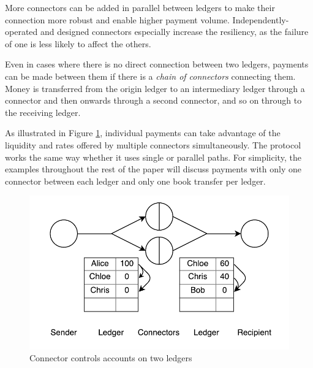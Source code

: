 \documentclass[letterpaper,twocolumn,10pt]{article}
\begin{document}
More connectors can be added in parallel between ledgers to make their connection more robust and enable higher payment volume. Independently-operated and designed connectors especially increase the resiliency, as the failure of one is less likely to affect the others.

Even in cases where there is no direct connection between two ledgers, payments can be made between them if there is a \textit{chain of connectors} connecting them. Money is transferred from the origin ledger to an intermediary ledger through a connector and then onwards through a second connector, and so on through to the receiving ledger.

As illustrated in Figure \ref{fig:parallel-path}, individual payments can take advantage of the liquidity and rates offered by multiple connectors simultaneously. The protocol works the same way whether it uses single or parallel paths. For simplicity, the examples throughout the rest of the paper will discuss payments with only one connector between each ledger and only one book transfer per ledger.

\begin{figure}[ht]
    \centering
    \includegraphics[width=\columnwidth]{figures/parallel-path.pdf}
    \caption{Connector controls accounts on two ledgers}
    \label{fig:parallel-path}
\end{figure}




\end{document}
